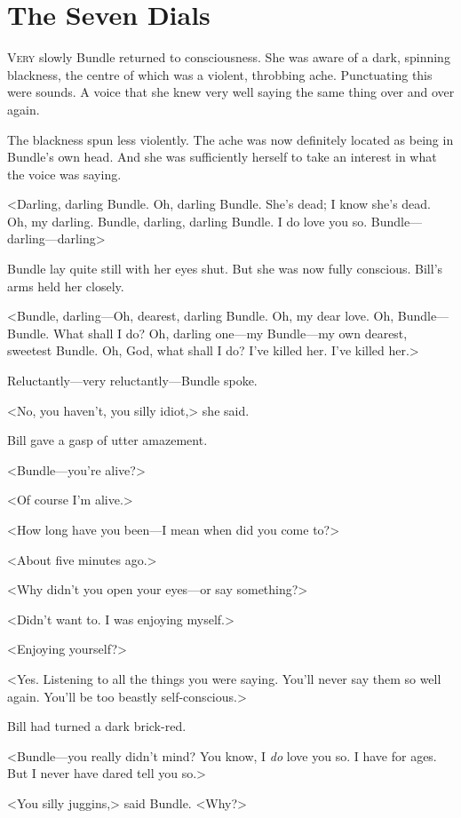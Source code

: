 \chapter{The Seven Dials}

\lettrine{V}{ery} slowly Bundle returned to consciousness. She was aware of a dark, spinning blackness, the centre of which was a violent, throbbing ache. Punctuating this were sounds. A voice that she knew very well saying the same thing over and over again.

The blackness spun less violently. The ache was now definitely located as being in Bundle's own head. And she was sufficiently herself to take an interest in what the voice was saying.

<Darling, darling Bundle. Oh, darling Bundle. She's dead; I know she's dead. Oh, my darling. Bundle, darling, darling Bundle. I do love you so. Bundle—darling—darling\longdash>

Bundle lay quite still with her eyes shut. But she was now fully conscious. Bill's arms held her closely.

<Bundle, darling—Oh, dearest, darling Bundle. Oh, my dear love. Oh, Bundle—Bundle. What shall I do? Oh, darling one—my Bundle—my own dearest, sweetest Bundle. Oh, God, what shall I do? I've killed her. I've killed her.>

Reluctantly—very reluctantly—Bundle spoke.

<No, you haven't, you silly idiot,> she said.

Bill gave a gasp of utter amazement.

<Bundle—you're alive?>

<Of course I'm alive.>

<How long have you been—I mean when did you come to?>

<About five minutes ago.>

<Why didn't you open your eyes—or say something?>

<Didn't want to. I was enjoying myself.>

<Enjoying yourself?>

<Yes. Listening to all the things you were saying. You'll never say them so well again. You'll be too beastly self-conscious.>

Bill had turned a dark brick-red.

<Bundle—you really didn't mind? You know, I \emph{do} love you so. I have for ages. But I never have dared tell you so.>

<You silly juggins,> said Bundle. <Why?>

